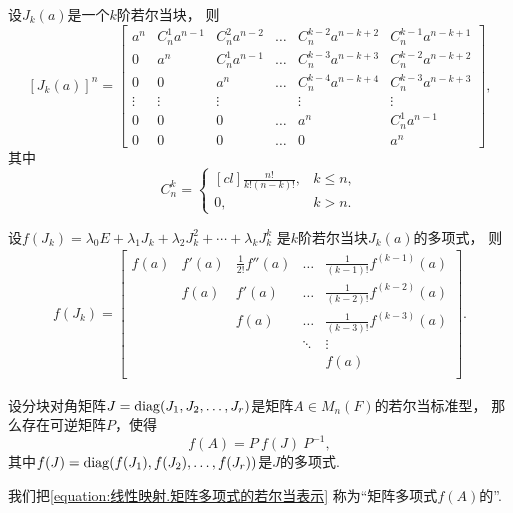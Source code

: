 \begin{example}
设\(J_k(a)\)是一个\(k\)阶若尔当块，
则\begin{equation*}
	[J_k(a)]^n
	=
	\begin{bmatrix}
		a^n & C_n^1 a^{n-1} & C_n^2 a^{n-2} & \dots & C_n^{k-2} a^{n-k+2} & C_n^{k-1} a^{n-k+1} \\
		0 & a^n & C_n^1 a^{n-1} & \dots & C_n^{k-3} a^{n-k+3} & C_n^{k-2} a^{n-k+2} \\
		0 & 0 & a^n & \dots & C_n^{k-4} a^{n-k+4} & C_n^{k-3} a^{n-k+3} \\
		\vdots & \vdots & \vdots & & \vdots & \vdots \\
		0 & 0 & 0 & \dots & a^n & C_n^1 a^{n-1} \\
		0 & 0 & 0 & \dots & 0 & a^n
	\end{bmatrix},
\end{equation*}
其中\begin{equation*}
	C_n^k = \begin{cases}[cl]
		\frac{n!}{k!(n-k)!},
		& k \leq n, \\
		0,
		& k > n.
	\end{cases}
\end{equation*}
\end{example}

\begin{example}
设\(f(J_k) = \lambda_0 E + \lambda_1 J_k + \lambda_2 J_k^2 + \dotsb + \lambda_k J_k^k\)
是\(k\)阶若尔当块\(J_k(a)\)的多项式，
则\begin{align*}
	f(J_k)
	= \begin{bmatrix}
		f(a) & f'(a) & \frac{1}{2!} f''(a) & \dots & \frac{1}{(k-1)!} f^{(k-1)}(a) \\
		& f(a) & f'(a) & \dots & \frac{1}{(k-2)!} f^{(k-2)}(a) \\
		&& f(a) & \dots & \frac{1}{(k-3)!} f^{(k-3)}(a) \\
		&&& \ddots & \vdots \\
		&&&& f(a) \\
	\end{bmatrix}.
\end{align*}
\end{example}

\begin{example}
设分块对角矩阵\(J = \operatorname{diag}(J_1,J_2,\dotsc,J_r)\)是矩阵\(A \in M_n(F)\)的若尔当标准型，
那么存在可逆矩阵\(P\)，使得\begin{equation}\label{equation:线性映射.矩阵多项式的若尔当表示}
	f(A) = P ~ f(J) ~ P^{-1},
\end{equation}
其中\(
	f(J) = \operatorname{diag}(f(J_1),f(J_2),\dotsc,f(J_r))
\)是\(J\)的多项式.
\end{example}
我们把\cref{equation:线性映射.矩阵多项式的若尔当表示}
称为“矩阵多项式\(f(A)\)的”.


